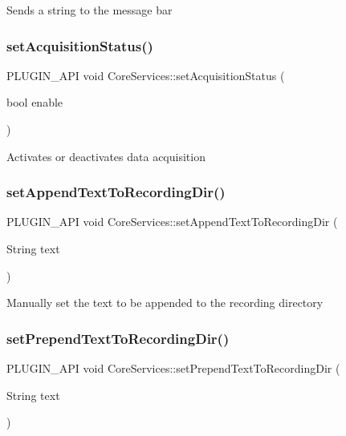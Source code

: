 Sends a string to the message bar \mbox{\label{namespace_core_services_a93b4f6a705bead14ce6caa04355b03ba}} 
\subsubsection{\texorpdfstring{set\+Acquisition\+Status()}{setAcquisitionStatus()}}
{\footnotesize\ttfamily P\+L\+U\+G\+I\+N\+\_\+\+A\+PI void Core\+Services\+::set\+Acquisition\+Status (\begin{DoxyParamCaption}\item[{bool}]{enable }\end{DoxyParamCaption})}

Activates or deactivates data acquisition \mbox{\label{namespace_core_services_a75af2d5d3262b95e16bd51fe28a7e26d}} 
\subsubsection{\texorpdfstring{set\+Append\+Text\+To\+Recording\+Dir()}{setAppendTextToRecordingDir()}}
{\footnotesize\ttfamily P\+L\+U\+G\+I\+N\+\_\+\+A\+PI void Core\+Services\+::set\+Append\+Text\+To\+Recording\+Dir (\begin{DoxyParamCaption}\item[{String}]{text }\end{DoxyParamCaption})}

Manually set the text to be appended to the recording directory \mbox{\label{namespace_core_services_a2ea8b92387e1ae7ce51180a3861e528c}} 
\subsubsection{\texorpdfstring{set\+Prepend\+Text\+To\+Recording\+Dir()}{setPrependTextToRecordingDir()}}
{\footnotesize\ttfamily P\+L\+U\+G\+I\+N\+\_\+\+A\+PI void Core\+Services\+::set\+Prepend\+Text\+To\+Recording\+Dir (\begin{DoxyParamCaption}\item[{String}]{text }\end{DoxyParamCaption})}


